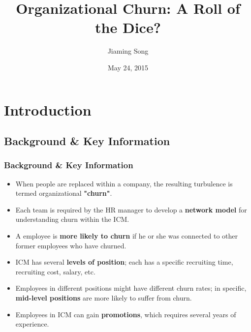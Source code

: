 \documentclass{beamer}
\title[Organizational Churn: A Roll of the Dice?]{Organizational Churn: A Roll of the Dice?} %
\author{Jiaming Song} %
\institute[Tsinghua University] %
{
Tsinghua University \\ %
\medskip
\textit{jiaming.tsong@gmail.com} %
}
\date{May 24, 2015} %
\begin{document}
\begin{frame}
\titlepage %
\end{frame}

\section{Introduction} %

\subsection{Background \& Key Information} %

\begin{frame}
\frametitle{Background \& Key Information}
\begin{itemize}
\item When people are replaced within a company, the resulting turbulence is termed organizational {\bf "churn"}. 
\item Each team is required by the HR manager to develop a {\bf network model} for understanding churn within the ICM.
\item A employee is {\bf more likely to churn} if he or she was connected to other former employees who have churned.
\item ICM has several {\bf levels of position}; each has a specific recruiting time, recruiting cost, salary, etc.
\item Employees in different positions might have different churn rates; in specific, {\bf mid-level positions} are more likely to suffer from churn.
\item Employees in ICM can gain {\bf promotions}, which requires several years of experience.
\end{itemize}
\end{frame}
\end{document}
